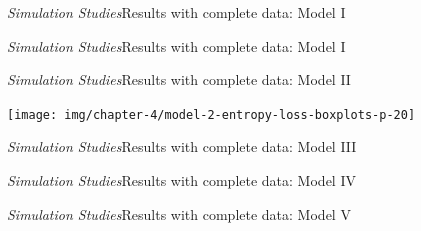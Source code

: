 \begin{frame}[c]{\emph{Simulation Studies}}{Results with complete data: Model I}
\centering
\end{frame}

\begin{frame}[c]{\emph{Simulation Studies}}{Results with complete data: Model I}
\centering
\end{frame}

\begin{frame}[c]{\emph{Simulation Studies}}{Results with complete data: Model II}
\begin{center}
  \texttt{[image: img/chapter-4/model-2-entropy-loss-boxplots-p-20]}
\end{center}
\end{frame}

\begin{frame}[c]{\emph{Simulation Studies}}{Results with complete data: Model III}
\centering
\end{frame}

\begin{frame}[c]{\emph{Simulation Studies}}{Results with complete data: Model IV}
\centering
\end{frame}
\begin{frame}[c]{\emph{Simulation Studies}}{Results with complete data: Model V}
\centering
\end{frame}

